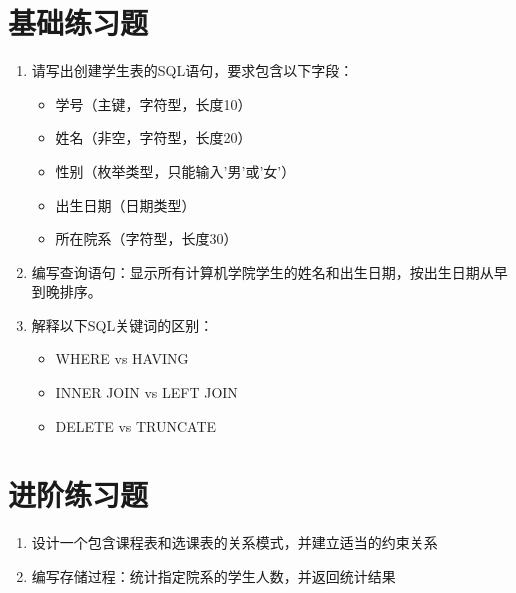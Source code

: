 \documentclass[12pt,a4paper]{article}
\begin{document}
\section{基础练习题}
\begin{enumerate}
    \item 请写出创建学生表的SQL语句，要求包含以下字段：
    \begin{itemize}
        \item 学号（主键，字符型，长度10）
        \item 姓名（非空，字符型，长度20）
        \item 性别（枚举类型，只能输入'男'或'女'）
        \item 出生日期（日期类型）
        \item 所在院系（字符型，长度30）
    \end{itemize}
    
    \vspace{3cm} %
    
    \item 编写查询语句：显示所有计算机学院学生的姓名和出生日期，按出生日期从早到晚排序。
    
    \vspace{3cm}
    
    \item 解释以下SQL关键词的区别：
    \begin{itemize}
        \item WHERE vs HAVING
        \item INNER JOIN vs LEFT JOIN
        \item DELETE vs TRUNCATE
    \end{itemize}
    
    \vspace{3cm}
\end{enumerate}

\section{进阶练习题}
\begin{enumerate}
    \item 设计一个包含课程表和选课表的关系模式，并建立适当的约束关系
    
    \vspace{5cm}
    
    \item 编写存储过程：统计指定院系的学生人数，并返回统计结果
    
    \vspace{5cm}
\end{enumerate}
\end{document}
